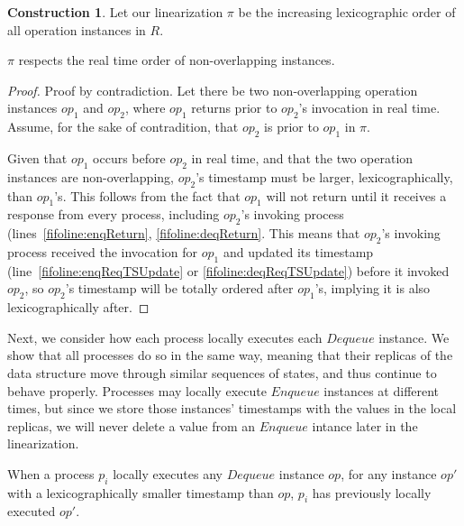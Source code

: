 \documentclass[a4paper,anonymous,USenglish]{lipics-v2021}
\theoremstyle{definition}
\newtheorem{construction}{Construction}
\begin{document}
\begin{construction}\label{constr:fifo}
  Let our linearization $\pi$ be the increasing lexicographic order of all operation instances in $R$.
\end{construction}

\begin{lemma}\label{fifolem:realTimeOrder}
  $\pi$ respects the real time order of non-overlapping instances.
\end{lemma}
\begin{proof}
  Proof by contradiction. Let there be two non-overlapping operation instances $op_1$ and $op_2$, where $op_1$ returns prior to $op_2$'s invocation in real time.  Assume, for the sake of contradition, that $op_2$ is prior to $op_1$ in $\pi$.
  
  Given that $op_1$ occurs before $op_2$ in real time, and that the two operation instances are non-overlapping, $op_2$'s timestamp must be larger, lexicographically, than $op_1$'s.  This follows from the fact that $op_1$ will not return until it receives a response from every process, including $op_2$'s invoking process (lines~\ref{fifoline:enqReturn}, \ref{fifoline:deqReturn}.  This means that $op_2$'s invoking process received the invocation for $op_1$ and updated its timestamp (line~\ref{fifoline:enqReqTSUpdate} or \ref{fifoline:deqReqTSUpdate}) before it invoked $op_2$, so $op_2$'s timestamp will be totally ordered after $op_1$'s, implying it is also lexicographically after.
\end{proof}

Next, we consider how each process locally executes each $Dequeue$ instance.  We show that all processes do so in the same way, meaning that their replicas of the data structure move through similar sequences of states, and thus continue to behave properly.  Processes may locally execute $Enqueue$ instances at different times, but since we store those instances' timestamps with the values in the local replicas, we will never delete a value from an $Enqueue$ intance later in the linearization.

\begin{lemma}\label{fifolem:prevLocalExec}
  When a process $p_i$ locally executes any $Dequeue$ instance $op$, for any instance $op'$ with a lexicographically smaller timestamp than $op$, $p_i$ has previously locally executed $op'$.
\end{lemma}
\end{document}
